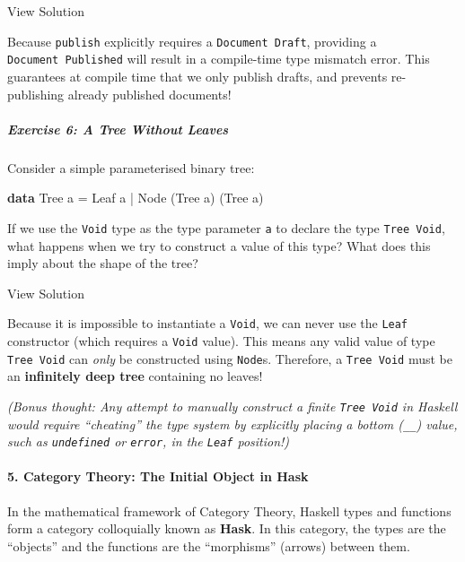 \documentclass[
]{article}
\newenvironment{Shaded}{}{}
\newcommand{\DataTypeTok}[1]{\textcolor[rgb]{0.56,0.13,0.00}{#1}}
\newcommand{\KeywordTok}[1]{\textcolor[rgb]{0.00,0.44,0.13}{\textbf{#1}}}
\newcommand{\NormalTok}[1]{#1}
\newcommand{\OperatorTok}[1]{\textcolor[rgb]{0.40,0.40,0.40}{#1}}
\newcommand{\OtherTok}[1]{\textcolor[rgb]{0.00,0.44,0.13}{#1}}
\begin{document}
View Solution

Because \texttt{publish} explicitly requires a \texttt{Document\ Draft},
providing a \texttt{Document\ Published} will result in a compile-time
type mismatch error. This guarantees at compile time that we only
publish drafts, and prevents re-publishing already published documents!

\subparagraph{Exercise 6: A Tree Without
Leaves}\label{exercise-6-a-tree-without-leaves}

Consider a simple parameterised binary tree:

\begin{Shaded}
\begin{Highlighting}[]
\KeywordTok{data} \DataTypeTok{Tree}\NormalTok{ a }\OtherTok{=} \DataTypeTok{Leaf}\NormalTok{ a }\OperatorTok{|} \DataTypeTok{Node}\NormalTok{ (}\DataTypeTok{Tree}\NormalTok{ a) (}\DataTypeTok{Tree}\NormalTok{ a)}
\end{Highlighting}
\end{Shaded}

If we use the \texttt{Void} type as the type parameter \texttt{a} to
declare the type \texttt{Tree\ Void}, what happens when we try to
construct a value of this type? What does this imply about the shape of
the tree?

View Solution

Because it is impossible to instantiate a \texttt{Void}, we can never
use the \texttt{Leaf} constructor (which requires a \texttt{Void}
value). This means any valid value of type \texttt{Tree\ Void} can
\emph{only} be constructed using \texttt{Node}s. Therefore, a
\texttt{Tree\ Void} must be an \textbf{infinitely deep tree} containing
no leaves!

\emph{(Bonus thought: Any attempt to manually construct a finite
\texttt{Tree\ Void} in Haskell would require ``cheating'' the type
system by explicitly placing a bottom (\texttt{\_\textbar{}\_}) value,
such as \texttt{undefined} or \texttt{error}, in the \texttt{Leaf}
position!)}

\paragraph{5. Category Theory: The Initial Object in
Hask}\label{category-theory-the-initial-object-in-hask}

In the mathematical framework of Category Theory, Haskell types and
functions form a category colloquially known as \textbf{Hask}. In this
category, the types are the ``objects'' and the functions are the
``morphisms'' (arrows) between them.
\end{document}

